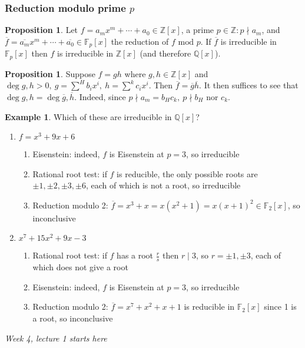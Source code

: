 \documentclass[a4paper]{article}
\newcommand{\Z}{\mathbb Z}
\newcommand{\Q}{\mathbb Q}
\newcommand{\Mod}{\text{ mod }}
\theoremstyle{definition}
\newtheorem{prop}[defn]{Proposition}
\newtheorem{example}[defn]{Example}
\begin{document}
\subsubsection{Reduction modulo prime $p$}
\begin{prop}
Let $f=a_m x^m+\cdots+a_0\in\Z[x]$, a prime $p\in\Z:p\nmid a_m$, and $\overline f = \overline{a_m}x^m+\cdots+\overline{a_0}\in\mathbb F_p[x]$ the reduction of $f\Mod p$. If $\overline f$ is irreducible in $\mathbb F_p[x]$ then $f$ is irreducible in $\Z[x]$ (and therefore $\Q[x]$).
\end{prop}
\begin{prop}
Suppose $f=gh$ where $g,h\in\Z[x]$ and $\deg g,h>0,\ g=\sum^H b_i x^i,\ h=\sum^k c_i x^i$. Then $\overline f=\overline g\overline h$. It then suffices to see that $\deg g,h=\deg \overline g,\overline h$. Indeed, since $p\nmid a_m=b_Hc_k,\ p\nmid b_H$ nor $c_k$.
\end{prop}

\begin{example}
Which of these are irreducible in $\Q[x]$?
\begin{enumerate}
\item $f=x^3+9x+6$
\begin{enumerate}
\item Eisenstein: indeed, $f$ is Eisenstein at $p=3$, so irreducible
\item Rational root test: if $f$ is reducible, the only possible roots are $\pm1,\pm2,\pm3,\pm6$, each of which is not a root, so irreducible
\item Reduction modulo 2: $\overline f=x^3+x=x(x^2+1)=x(x+1)^2\in\mathbb F_2[x]$, so inconclusive
\end{enumerate}
\item $x^7+15x^2+9x-3$
\begin{enumerate}
\item Rational root test: if $f$ has a root $\frac{r}{s}$ then $r\mid 3$, so $r=\pm1,\pm3$, each of which does not give a root
\item Eisenstein: indeed, $f$ is Eisenstein at $p=3$, so irreducible
\item Reduction modulo 2: $\overline f=x^7+x^2+x+1$ is reducible in $\mathbb F_2[x]$ since 1 is a root, so inconclusive
\end{enumerate}
\end{enumerate}
\end{example}

\begin{flushright}
\textit{Week 4, lecture 1 starts here}
\end{flushright}
\end{document}
